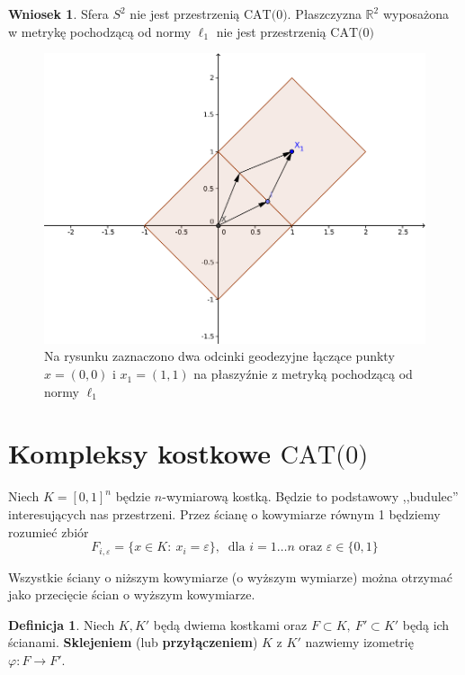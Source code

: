 \documentclass[licencjacka]{pracamgr}
\theoremstyle{definition}
\newtheorem{definition}{Definicja}[section]
\theoremstyle{definition}
\theoremstyle{definition}
\theoremstyle{definition}
\theoremstyle{definition}
\newtheorem{corollary}{Wniosek}[section]
\theoremstyle{plain}
\theoremstyle{plain}
\begin{document}
\begin{corollary}
	Sfera $ S^2 $ nie jest przestrzenią $ \text{CAT(0)} $. Płaszczyzna $ \mathbb{R}^2 $ 
	wyposażona w metrykę pochodzącą od normy $ \ell_1 $ nie jest przestrzenią $ \text{CAT(0)} $
	\begin{figure}
	\caption{\small{Na rysunku zaznaczono dwa odcinki geodezyjne łączące punkty 
	$ x = (0,0) $ i $ x_1 = (1,1) $ na płaszyźnie z metryką pochodzącą od normy $ \ell_1 $}}
	\centering
	\includegraphics{plaszczyzna_l1}
	\end{figure}
\end{corollary}

\section{Kompleksy kostkowe $ \text{CAT(0)} $}
Niech $ K = [0,1]^n $ będzie $ n $-wymiarową kostką. Będzie to podstawowy ,,budulec'' 
interesujących nas przestrzeni. Przez ścianę o kowymiarze równym 1 będziemy rozumieć zbiór 
$$ F_{i,\varepsilon}  = \{x \in K : ~ x_i = \varepsilon\}, ~ \text{ dla } i = 1 
\dots n \text{ oraz }\varepsilon \in \{0,1\}$$

Wszystkie ściany o niższym kowymiarze (o wyższym wymiarze) można otrzymać jako 
przecięcie ścian o wyższym kowymiarze.

\begin{definition}
	Niech $ K,K' $ będą dwiema kostkami oraz $ F \subset K, ~ F' \subset K' $ będą 
	ich ścianami. \textbf{Sklejeniem} (lub \textbf{przyłączeniem}) $ K $ z $ K' $ nazwiemy 
	izometrię $ \varphi: F \rightarrow F' $.
\end{definition}
\end{document}
